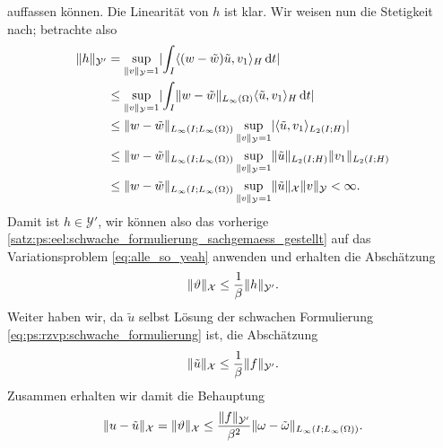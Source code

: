 \begin{Lemma}
\begin{Beweis}
\begin{equation}
        \end{equation}
        auffassen können.
        Die Linearität von $h$ ist klar.
        Wir weisen nun die Stetigkeit nach; betrachte also
        \begin{align}
            \lVert h\rVert_{\mathcal Y'}
            &= \sup_{\lVert v\rVert_{\mathcal Y} = 1} \lvert\int_{I} \langle(w - \tilde{w})\tilde{u},v_{1}\rangle_{H} \mathop{}\!\mathrm{d} t\rvert
            \\&\leq \sup_{\lVert v\rVert_{\mathcal Y} = 1} \lvert\int_{I} \lVert w - \tilde{w}\rVert_{L_{\infty}(\Omega)} \langle\tilde{u},v_{1}\rangle_{H} \mathop{}\!\mathrm{d} t\rvert
            \\&\leq \lVert w - \tilde{w}\rVert_{L_{\infty}(I; L_{\infty}(\Omega))} \sup_{\lVert v\rVert_{\mathcal Y} = 1} \lvert\langle\tilde{u},v_{1}\rangle_{L_{2}(I; H)}\rvert
            \\&\leq \lVert w - \tilde{w}\rVert_{L_{\infty}(I; L_{\infty}(\Omega))} \sup_{\lVert v\rVert_{\mathcal Y} = 1} \lVert\tilde{u}\rVert_{L_{2}(I; H)} \lVert v_{1}\rVert_{L_{2}(I; H)}
            \\&\leq \lVert w - \tilde{w}\rVert_{L_{\infty}(I; L_{\infty}(\Omega))} \sup_{\lVert v\rVert_{\mathcal Y} = 1} \lVert\tilde{u}\rVert_{\mathcal X} \lVert v\rVert_{\mathcal Y}
            < \infty.
        \end{align}
        Damit ist $h \in \mathcal Y'$, wir können also das vorherige \cref{satz:ps:eel:schwache_formulierung_sachgemaess_gestellt} auf das Variationsproblem \cref{eq:alle_so_yeah} anwenden und erhalten die Abschätzung
        \begin{equation}
            \lVert\vartheta\rVert_{\mathcal X} \leq \frac{1}{\beta} \lVert h\rVert_{\mathcal Y'}.
        \end{equation}
        Weiter haben wir, da $\tilde{u}$ selbst Lösung der schwachen Formulierung \cref{eq:ps:rzvp:schwache_formulierung} ist, die Abschätzung
        \begin{equation}
            \lVert\tilde{u}\rVert_{\mathcal X} \leq \frac{1}{\beta} \lVert f\rVert_{\mathcal Y'}.
        \end{equation}
        Zusammen erhalten wir damit die Behauptung
        \begin{equation}
            \lVert u - \tilde{u}\rVert_{\mathcal X} = \lVert\vartheta\rVert_{\mathcal X} \leq \frac{\lVert f\rVert_{\mathcal Y'}}{\beta^{2}} \lVert\omega - \tilde{\omega}\rVert_{L_{\infty}(I; L_{\infty}(\Omega))}.
        \end{equation}
    \end{Beweis}
\end{Lemma}

